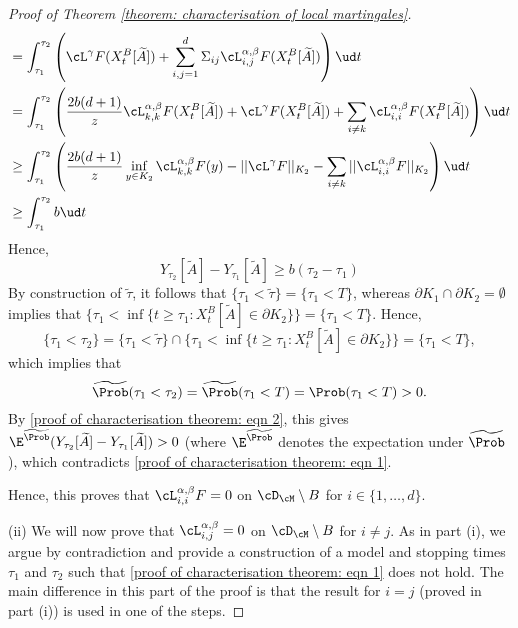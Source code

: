 \documentclass[11pt]{article}
\begin{document}
\begin{proof}[Proof of Theorem \ref{theorem: characterisation of local martingales}]
\begin{align*}
%
%
%
&= \int_{\tau_1}^{\tau_2} \left( \cL^\gamma F(X^B_t[\widetilde{A}]) + \sum_{i,j=1}^d \Sigma_{ij} \cL^{\alpha,\beta}_{i,j} F(X^B_t[\widetilde{A}]) \right) \ud t \\
%
%
%
&= \int_{\tau_1}^{\tau_2} \left( \frac{2b(d+1)}{z} \cL^{\alpha,\beta}_{k,k} F(X^B_t[\widetilde{A}]) + \cL^\gamma F(X^B_t[\widetilde{A}]) + \sum_{i \neq k} \cL^{\alpha,\beta}_{i,i} F(X^B_t[\widetilde{A}]) \right) \ud t \\
%
%
%
& \geq \int_{\tau_1}^{\tau_2} \left( \frac{2b(d+1)}{z} \inf_{y \in K_2} \cL^{\alpha,\beta}_{k,k} F(y) - || \cL^\gamma F ||_{K_2} - \sum_{i \neq k} || \cL^{\alpha,\beta}_{i,i} F||_{K_2} \right) \ud t \\
& \geq \int_{\tau_1}^{\tau_2} b \ud t
\end{align*}
Hence,
\begin{equation}
\label{proof of characterisation theorem: eqn 2}
Y_{\tau_2}[\widetilde{A}] - Y_{\tau_1}[\widetilde{A}] \geq b(\tau_2 - \tau_1)
\end{equation}
By construction of $\widetilde{\tau}$, it follows that $\{ \tau_1 < \widetilde{\tau} \} = \{ \tau_1 < T \}$, whereas $\partial K_1 \cap \partial K_2 = \emptyset$ implies that $\{ \tau_1 < \inf\{ t \geq \tau_1 : X^B_t[\widetilde{A}] \in \partial K_2 \} \} = \{\tau_1 < T \}$. Hence,
$$
\{ \tau_1 < \tau_2 \} = \{\tau_1 < \widetilde{\tau} \} \cap \{\tau_1 < \inf\{ t \geq \tau_1 : X^B_t[\widetilde{A}] \in \partial K_2 \} \} = \{ \tau_1 < T \},
$$
which implies that
$$
\widetilde{\Prob}(\tau_1 < \tau_2) = \widetilde{\Prob}(\tau_1 < T) = \Prob(\tau_1 < T) > 0.
$$
By \eqref{proof of characterisation theorem: eqn 2}, this gives $\E^{\widetilde{\Prob}}( Y_{\tau_2}[\widetilde{A}] - Y_{\tau_1}[\widetilde{A}] ) > 0$ (where $\E^{\widetilde{\Prob}}$ denotes the expectation under $\widetilde{\Prob}$), which contradicts \eqref{proof of characterisation theorem: eqn 1}. 

Hence, this proves that $\cL^{\alpha,\beta}_{i,i} F = 0$ on $\cD_{\cM} \setminus B$ for $i \in \{1,\ldots,d\}$.

\item (ii) We will now prove that $\cL^{\alpha,\beta}_{i,j} = 0$ on $\cD_{\cM} \setminus B$ for $i \neq j$. As in part (i), we argue by contradiction and provide a construction of a model and stopping times $\tau_1$ and $\tau_2$ such that \eqref{proof of characterisation theorem: eqn 1} does not hold. The main difference in this part of the proof is that the result for $i = j$ (proved in part (i)) is used in one of the steps.


\end{proof}
\end{document}
